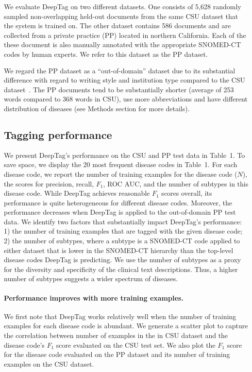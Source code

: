 \documentclass{article}[11pt,oneside]
\begin{document}
We evaluate DeepTag on two different datasets. One consists of 5,628 randomly sampled non-overlapping held-out documents from the same CSU dataset that the system is trained on. The other dataset contains 586 documents and are collected from a private practice (PP) located in northern California. Each of the these document is also manually annotated with the appropriate SNOMED-CT codes by human experts. We refer to this dataset as the PP dataset. 

We regard the PP dataset as a ``out-of-domain'' dataset due to its substantial difference with regard to writing style and institution type compared to the CSU dataset~\cite{li2012literature}. The PP documents tend to be substantially shorter (average of 253 words compared to 368 words in CSU), use more abbreviations and have different distribution of diseases (see Methods section for more details).
 
\subsection*{Tagging performance}

We present DeepTag's performance on the CSU and PP test data in Table~1. To save space, we display the 20 most frequent disease codes in Table~1. For each disease code, we report the number of training examples for the disease code ($N$), the scores for precision, recall, $F_1$, ROC AUC, and the number of subtypes in this disease code. While DeepTag achieves reasonable $F_1$ scores overall, its performance is quite heterogeneous for different disease codes. Moreover, the performance decreases when DeepTag is applied to the out-of-domain PP test data. 
We identify two factors that substantially impact DeepTag's performance: 1) the number of training examples that are tagged with the given disease code; 2) the number of subtypes, where a subtype is a SNOMED-CT code applied to either dataset that is lower in the SNOMED-CT hierarchy than the top-level disease codes DeepTag is predicting. We use the number of subtypes as a proxy for the diversity and specificity of the clinical text descriptions. Thus, a higher number of subtypes suggests a wider spectrum of diseases.

\paragraph{Performance improves with more training examples.}
We first note that DeepTag works relatively well when the number of training examples for each disease code is abundant. We generate a scatter plot to capture the correlation between number of examples in the in CSU dataset and the disease code's $F_1$ score evaluated on the CSU test set. We also plot the $F_1$ score for the disease code evaluated on the PP dataset and its number of training examples on the CSU dataset. 
\end{document}
